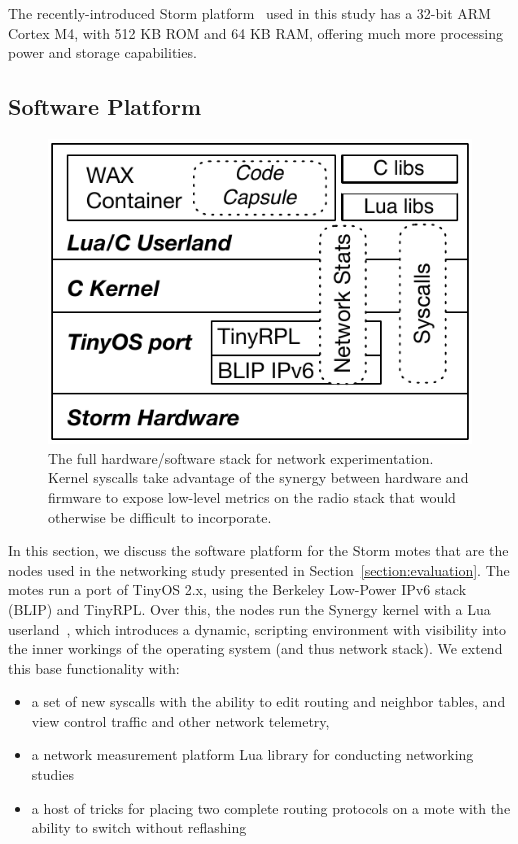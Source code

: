 The recently-introduced Storm platform~\cite{andersen2016system} used in this study has a 32-bit ARM Cortex M4, with 512 KB ROM and 64 KB RAM, offering much more processing power and storage capabilities.


\subsection{Software Platform}

\begin{figure}[t]
\centering
\includegraphics[width=.9\linewidth]{figs/NodeStack}
\caption{The full hardware/software stack for network experimentation. Kernel syscalls take advantage of the synergy between hardware and firmware to expose low-level metrics on the radio stack that would otherwise be difficult to incorporate.}
\label{fig:nodestack}
\end{figure}


In this section, we discuss the software platform for the Storm motes that are the nodes used in the networking study presented in Section~\ref{section:evaluation}.
The motes run a port of TinyOS 2.x, using the Berkeley Low-Power IPv6 stack (BLIP) and TinyRPL.
Over this, the nodes run the Synergy kernel with a Lua userland~\cite{andersen2016system}, which introduces a dynamic, scripting environment with visibility into the inner workings of the operating system (and thus network stack).
We extend this base functionality with:
\begin{itemize}
\item a set of new syscalls with the ability to edit routing and neighbor tables, and view control traffic and other network telemetry,
\item a network measurement platform Lua library for conducting networking studies
\item a host of tricks for placing two complete routing protocols on a mote with the ability to switch without reflashing
\end{itemize}

